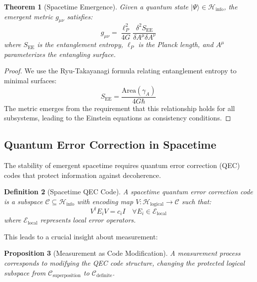 \documentclass[12pt,a4paper]{article}
\newtheorem{theorem}{Theorem}[section]
\newtheorem{proposition}[theorem]{Proposition}
\newtheorem{definition}[theorem]{Definition}
\begin{document}
\begin{theorem}[Spacetime Emergence]
Given a quantum state $|\Psi\rangle \in \mathcal{H}_{\text{info}}$, the emergent metric $g_{\mu\nu}$ satisfies:
\begin{equation}
g_{\mu\nu} = \frac{\ell_P^2}{4G} \frac{\delta^2 S_{\text{EE}}}{\delta A^\mu \delta A^\nu}
\end{equation}
where $S_{\text{EE}}$ is the entanglement entropy, $\ell_P$ is the Planck length, and $A^\mu$ parameterizes the entangling surface.
\end{theorem}

\begin{proof}
We use the Ryu-Takayanagi formula relating entanglement entropy to minimal surfaces:
\begin{equation}
S_{\text{EE}} = \frac{\text{Area}(\gamma_A)}{4G\hbar}
\end{equation}
The metric emerges from the requirement that this relationship holds for all subsystems, leading to the Einstein equations as consistency conditions.
\end{proof}

\subsection{Quantum Error Correction in Spacetime}

The stability of emergent spacetime requires quantum error correction (QEC) codes that protect information against decoherence.

\begin{definition}[Spacetime QEC Code]
A spacetime quantum error correction code is a subspace $\mathcal{C} \subseteq \mathcal{H}_{\text{info}}$ with encoding map $V: \mathcal{H}_{\text{logical}} \rightarrow \mathcal{C}$ such that:
\begin{equation}
V^\dagger E_i V = c_i I \quad \forall E_i \in \mathcal{E}_{\text{local}}
\end{equation}
where $\mathcal{E}_{\text{local}}$ represents local error operators.
\end{definition}

This leads to a crucial insight about measurement:

\begin{proposition}[Measurement as Code Modification]
A measurement process corresponds to modifying the QEC code structure, changing the protected logical subspace from $\mathcal{C}_{\text{superposition}}$ to $\mathcal{C}_{\text{definite}}$.
\end{proposition}
\end{document}
